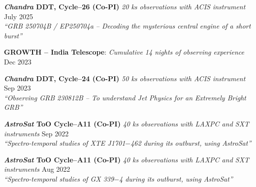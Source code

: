 \textbf{\textit{Chandra} DDT, Cycle--26 (Co-PI)} \textit{20 ks observations with ACIS instrument} \hfill July 2025 \\
\textit{``GRB 250704B / EP250704a -- Decoding the mysterious central engine of a short burst''}

\vspace{0.5em}

\textbf{GROWTH -- India Telescope}: \textit{Cumulative 14 nights of observing experience} \hfill Dec 2023 \\

\vspace{0.5em}

\textbf{\textit{Chandra} DDT, Cycle--24 (Co-PI)} \textit{50 ks observations with ACIS instrument} \hfill Sep 2023 \\
\textit{``Observing GRB 230812B -- To understand Jet Physics for an Extremely Bright GRB''}

\vspace{0.5em}

\textbf{\textit{AstroSat} ToO Cycle--A11 (Co-PI)} \textit{40 ks observations with LAXPC and SXT instruments} \hfill Sep 2022 \\
\textit{``Spectro-temporal studies of XTE J1701$-$462 during its outburst, using \em{AstroSat}''}

\vspace{0.5em}

\textbf{\textit{AstroSat} ToO Cycle--A11 (Co-PI)} \textit{40 ks observations with LAXPC and SXT instruments} \hfill Aug 2022 \\
\textit{``Spectro-temporal studies of GX 339$-$4 during its outburst, using \textit{AstroSat}''}